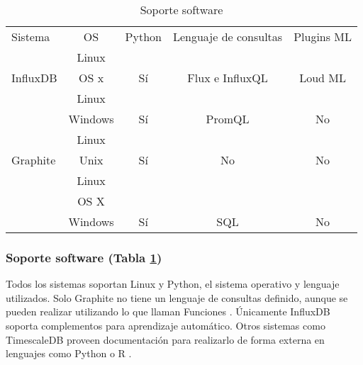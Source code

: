 \begin{table}[H]
    \begin{center}
        \begin{adjustbox}{max width=\textwidth}
            \begin{tabular}{l c c c c}
                \toprule
                Sistema & OS & Python & Lenguaje de consultas & Plugins ML\\
                \otoprule
                & Linux &                       &  \\
                \multirow{-2}{*}{InfluxDB} & OS x  & \multirow{-2}{*}{Sí} & \multirow{-2}{*}{Flux e InfluxQL} & \multirow{-2}{*}{Loud ML} \\
                \rowcolor{gray!35}
                                            & Linux   &                        & & \\
                \rowcolor{gray!35}
                \multirow{-2}{*}{Prometheus} & Windows & \multirow{-2}{*}{Sí}  & \multirow{-2}{*}{PromQL} & \multirow{-2}{*}{No}\\
                                        & Linux &                       &  & \\
                \multirow{-2}{*}{Graphite} & Unix  & \multirow{-2}{*}{Sí}  & \multirow{-2}{*}{No} & \multirow{-2}{*}{No} \\
                \rowcolor{gray!35}
                                            & Linux   &                             & & \\
                \rowcolor{gray!35}
                                            & OS X    &                             & & \\
                \rowcolor{gray!35}
                \multirow{-3}{*}{TimescaleDB} & Windows & \multirow{-3}{*}{Sí} & \multirow{-3}{*}{SQL} & \multirow{-3}{*}{No} \\
                \bottomrule
            \end{tabular}
        \end{adjustbox}
        \caption{Soporte software}
        \label{tabla:sssgbd}
    \end{center}
\end{table}

\subsubsection{Soporte software (Tabla \ref{tabla:sssgbd})} Todos los sistemas soportan Linux y Python, el sistema operativo 
y lenguaje utilizados. Solo Graphite no tiene un lenguaje de consultas definido, aunque se pueden realizar utilizando lo que 
llaman Funciones \cite{graphite-functions}. Únicamente InfluxDB soporta complementos para aprendizaje automático. Otros sistemas como
TimescaleDB proveen documentación para realizarlo de forma externa en lenguajes como Python o R \cite{timescale-forecasting}.

